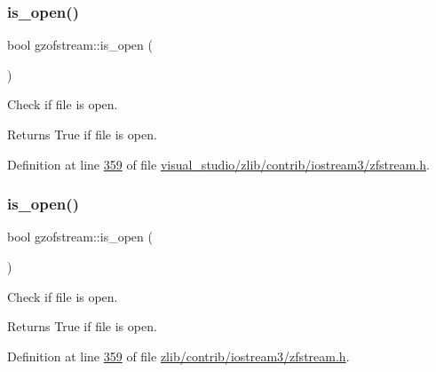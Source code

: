 \subsubsection{\texorpdfstring{is\+\_\+open()}{is\_open()}\hspace{0.1cm}{\footnotesize\ttfamily [1/2]}}
{\footnotesize\ttfamily bool gzofstream\+::is\+\_\+open (\begin{DoxyParamCaption}{ }\end{DoxyParamCaption})\hspace{0.3cm}{\ttfamily [inline]}}



Check if file is open. 

\begin{DoxyReturn}{Returns}
True if file is open. 
\end{DoxyReturn}


Definition at line \hyperlink{visual__studio_2zlib_2contrib_2iostream3_2zfstream_8h_source_l00359}{359} of file \hyperlink{visual__studio_2zlib_2contrib_2iostream3_2zfstream_8h_source}{visual\+\_\+studio/zlib/contrib/iostream3/zfstream.\+h}.

\mbox{\label{classgzofstream_acb1c9c6dccaf41bc5e44c2263ea48de3}} 
\subsubsection{\texorpdfstring{is\+\_\+open()}{is\_open()}\hspace{0.1cm}{\footnotesize\ttfamily [2/2]}}
{\footnotesize\ttfamily bool gzofstream\+::is\+\_\+open (\begin{DoxyParamCaption}{ }\end{DoxyParamCaption})\hspace{0.3cm}{\ttfamily [inline]}}



Check if file is open. 

\begin{DoxyReturn}{Returns}
True if file is open. 
\end{DoxyReturn}


Definition at line \hyperlink{zlib_2contrib_2iostream3_2zfstream_8h_source_l00359}{359} of file \hyperlink{zlib_2contrib_2iostream3_2zfstream_8h_source}{zlib/contrib/iostream3/zfstream.\+h}.

\mbox{\label{classgzofstream_aee3eb31f07eda7f5ad1f60d59ea4b239}} 
